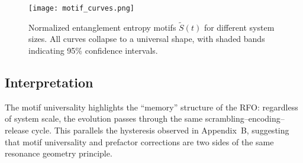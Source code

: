 \documentclass[12pt]{article}
\begin{document}
\begin{figure}[h]
\centering
\texttt{[image: motif\_curves.png]}
\caption{Normalized entanglement entropy motifs $\tilde S(t)$ for
different system sizes. All curves collapse to a universal shape,
with shaded bands indicating 95\% confidence intervals.}
\label{fig:motif_curves}
\end{figure}

\subsection*{Interpretation}

The motif universality highlights the ``memory'' structure of the RFO:
regardless of system scale, the evolution passes through the same
scrambling--encoding--release cycle. This parallels the hysteresis
observed in Appendix~B, suggesting that motif universality and prefactor
corrections are two sides of the same resonance geometry principle.
\end{document}
